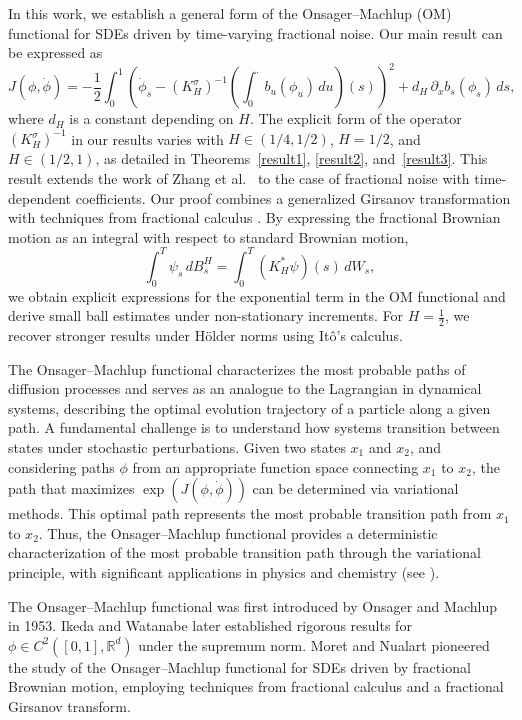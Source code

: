 \documentclass[preprint,12pt]{elsarticle}
\theoremstyle{definition}  %
\theoremstyle{plain}  %
\begin{document}
In this work, we establish a general form of the Onsager–Machlup (OM) functional for SDEs driven by time-varying fractional noise. Our main result can be expressed as
\begin{equation}
    J(\phi, \dot{\phi}) = -\frac{1}{2}
    \int_0^1 \left( \dot{\phi}_s - (K_H^\sigma)^{-1}\!\left( \int_0^\cdot b_u(\phi_u) \, du \right)(s) \right)^2 
    + d_H \, \partial_x b_s(\phi_s) \, ds ,
\end{equation}
where $d_H$ is a constant depending on $H$.  The explicit form of the operator $(K_H^{\sigma})^{-1}$ in our results varies with 
$H \in (1/4, 1/2)$, $H = 1/2$, and $H \in (1/2, 1)$, 
as detailed in Theorems~\ref{result1}, \ref{result2}, and~\ref{result3}.
This result extends the work of Zhang et al.~\cite{zhang2024onsagermachlupfunctionalstochasticdifferential} to the case of fractional noise with time-dependent coefficients.  
Our proof combines a generalized Girsanov transformation with techniques from fractional calculus \cite{Nualart}. By expressing the fractional Brownian motion as an integral with respect to standard Brownian motion,
\begin{equation*}
    \int_0^T \psi_s \, dB^H_s
    = \int_0^T (K_H^* \psi)(s) \, dW_s ,
\end{equation*}
we obtain explicit expressions for the exponential term in the OM functional and derive small ball estimates under non-stationary increments.  
For $H=\tfrac{1}{2}$, we recover stronger results under Hölder norms using Itô’s calculus.  


The Onsager–Machlup functional characterizes the most probable paths of diffusion processes and serves as an analogue to the Lagrangian in dynamical systems, describing the optimal evolution trajectory of a particle along a given path. A fundamental challenge is to understand how systems transition between states under stochastic perturbations. Given two states $x_1$ and $x_2$, and considering paths $\phi$ from an appropriate function space connecting $x_1$ to $x_2$, the path that maximizes $\exp(J(\phi,\dot{\phi}))$ can be determined via variational methods. This optimal path represents the most probable transition path from $x_1$ to $x_2$. Thus, the Onsager–Machlup functional provides a deterministic characterization of the most probable transition path through the variational principle, with significant applications in physics and chemistry (see \cite{BATTEZZATI2013163,Durr1979}).

The Onsager–Machlup functional was first introduced by Onsager and Machlup \cite{Onsager1953} in 1953. Ikeda and Watanabe \cite{ikeda1981stochastic} later established rigorous results for $\phi \in C^2([0,1], \mathbb{R}^d)$ under the supremum norm. Moret and Nualart \cite{Nualart} pioneered the study of the Onsager–Machlup functional for SDEs driven by fractional Brownian motion, employing techniques from fractional calculus and a fractional Girsanov transform. 
\end{document}
